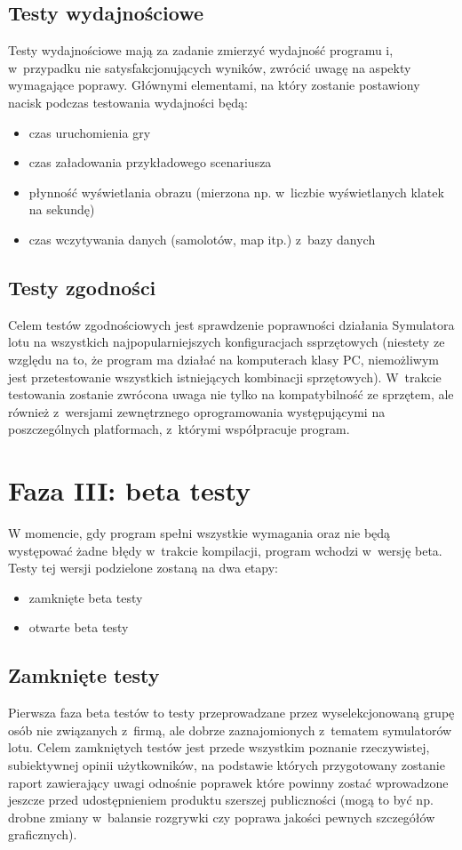 \documentclass{mwrep}
\begin{document}
\section{Testy wydajnościowe}
Testy wydajnościowe mają za zadanie zmierzyć wydajność programu i, w~przypadku nie satysfakcjonujących wyników, zwrócić uwagę na \linebreak aspekty wymagające poprawy. Głównymi elementami, na który zostanie postawiony nacisk podczas testowania wydajności będą:
\begin{itemize}
\item czas uruchomienia gry
\item czas załadowania przykładowego scenariusza
\item płynność wyświetlania obrazu (mierzona np. w~liczbie wyświetlanych klatek na sekundę)
\item czas wczytywania danych (samolotów, map itp.) z~bazy danych
\end{itemize}

\section{Testy zgodności}
Celem testów zgodnościowych jest sprawdzenie poprawności działania Symulatora lotu na wszystkich najpopularniejszych konfiguracjach \linebreak ssprzętowych (niestety ze względu na to, że program ma działać na komputerach klasy PC, niemożliwym jest przetestowanie wszystkich istniejących kombinacji sprzętowych). W~trakcie testowania zostanie zwrócona uwaga nie tylko na kompatybilność ze sprzętem, ale również z~wersjami zewnętrznego oprogramowania występującymi na poszczególnych platformach, z~którymi współpracuje program.

\chapter{Faza III: beta testy}
W momencie, gdy program spełni wszystkie wymagania oraz nie będą występować żadne błędy w~trakcie kompilacji, program wchodzi w~wersję beta. Testy tej wersji podzielone zostaną na dwa etapy:
\begin{itemize}
\item zamknięte beta testy
\item otwarte beta testy
\end{itemize}

\section{Zamknięte testy}
Pierwsza faza beta testów to testy przeprowadzane przez wyselekcjonowaną grupę osób nie związanych z~firmą, ale dobrze zaznajomionych z~tematem symulatorów lotu. Celem zamkniętych testów jest przede wszystkim poznanie rzeczywistej, subiektywnej opinii użytkowników, na podstawie których przygotowany zostanie raport zawierający uwagi odnośnie poprawek które powinny zostać wprowadzone jeszcze przed udostępnieniem produktu szerszej publiczności (mogą to być np. drobne zmiany w~balansie rozgrywki czy poprawa jakości pewnych szczegółów graficznych).
\end{document}
